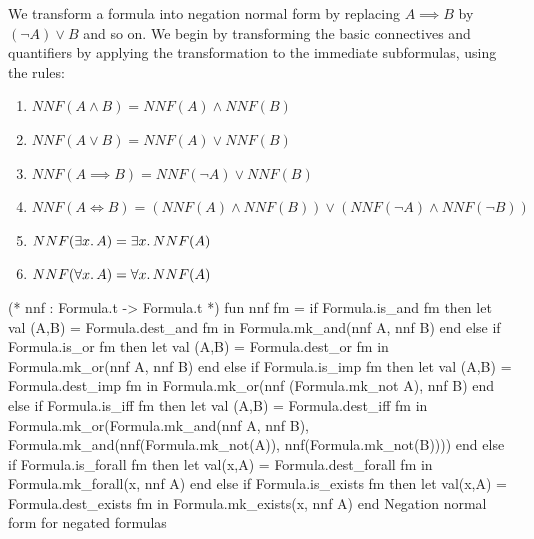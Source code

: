\begin{node}%
We transform a formula into negation normal form by replacing
$A\implies B$ by $(\neg A)\lor B$ and so on. We begin by transforming
the basic connectives and quantifiers by applying the transformation
to the immediate subformulas, using the rules:
\begin{enumerate}
\item $NNF(A\land B)=NNF(A)\land NNF(B)$
\item $NNF(A\lor B)=NNF(A)\lor NNF(B)$
\item $NNF(A\implies B)=NNF(\neg A)\lor NNF(B)$
\item $NNF(A\iff B)=(NNF(A)\land NNF(B))\lor(NNF(\neg A)\land NNF(\neg B))$
\item $NNF(\exists x\ldotp A)=\exists x\ldotp NNF(A)$
\item $NNF(\forall x\ldotp A)=\forall x\ldotp NNF(A)$
\end{enumerate}
\end{node}

\nwenddocs{}\endmoddef\nwstartdeflinemarkup{}\nwenddeflinemarkup
(* nnf : Formula.t -> Formula.t *)
fun nnf fm =
  if Formula.is_and fm
  then let val (A,B) = Formula.dest_and fm
       in Formula.mk_and(nnf A, nnf B) end
  else if Formula.is_or fm
  then let val (A,B) = Formula.dest_or fm
       in Formula.mk_or(nnf A, nnf B) end
  else if Formula.is_imp fm
  then let val (A,B) = Formula.dest_imp fm
       in Formula.mk_or(nnf (Formula.mk_not A),
                        nnf B) end
  else if Formula.is_iff fm
  then let val (A,B) = Formula.dest_iff fm
       in Formula.mk_or(Formula.mk_and(nnf A, nnf B),
                        Formula.mk_and(nnf(Formula.mk_not(A)), nnf(Formula.mk_not(B)))) end
  else if Formula.is_forall fm
  then let val(x,A) = Formula.dest_forall fm
       in Formula.mk_forall(x, nnf A) end
  else if Formula.is_exists fm
  then let val(x,A) = Formula.dest_exists fm
       in Formula.mk_exists(x, nnf A) end
  \LA{}Negation normal form for negated formulas~{\nwtagstyle{}}\RA{}

